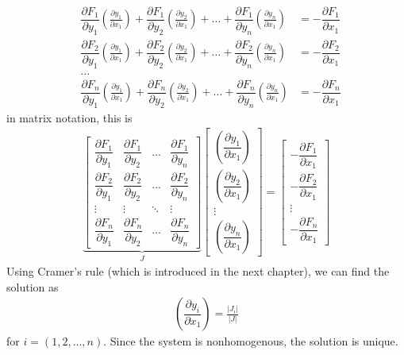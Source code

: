 \documentclass[10pt,a4paper]{book}
\theoremstyle{definition}\newtheorem{definition}{Definition}
\theoremstyle{definition}\newtheorem{fact}{Fact}
\theoremstyle{definition}\newtheorem{ex}{Ex.}
\theoremstyle{definition}\newtheorem{project}{Project}
\theoremstyle{definition}\newtheorem{problem}{Problem}
\theoremstyle{definition}\newtheorem{example}{Example}
\numberwithin{theorem}{chapter}
\numberwithin{corollary}{chapter}
\numberwithin{assumption}{chapter}
\numberwithin{definition}{chapter}
\numberwithin{prop}{chapter}
\numberwithin{notation}{chapter}
\numberwithin{problem}{chapter}
\numberwithin{example}{chapter}
\numberwithin{fact}{chapter}
\numberwithin{ex}{chapter}
\begin{document}
	\begin{align*}
		&\dfrac{\partial F_1}{\partial y_1} \left( \frac{\partial y_1}{\partial x_1} \right) + \dfrac{\partial F_1}{\partial y_2} \left( \frac{\partial y_2}{\partial x_1} \right) + \dots + \dfrac{\partial F_1}{\partial y_n} \left( \frac{\partial y_n}{\partial x_1} \right) &= -  \dfrac{\partial F_1}{\partial x_1}  \\
		&\dfrac{\partial F_2}{\partial y_1} \left( \frac{\partial y_1}{\partial x_1} \right) + \dfrac{\partial F_2}{\partial y_2} \left( \frac{\partial y_2}{\partial x_1} \right) + \dots + \dfrac{\partial F_2}{\partial y_n} \left( \frac{\partial y_n}{\partial x_1} \right) &= -  \dfrac{\partial F_2}{\partial x_1}  \\
		&\dots \\
		&\dfrac{\partial F_n}{\partial y_1} \left( \frac{\partial y_1}{\partial x_1} \right) + \dfrac{\partial F_n}{\partial y_2} \left( \frac{\partial y_2}{\partial x_1} \right) + \dots + \dfrac{\partial F_n}{\partial y_n} \left( \frac{\partial y_n}{\partial x_1} \right) &= -  \dfrac{\partial F_n}{\partial x_1} 
	\end{align*}	
	in matrix notation, this is
	\begin{align*}
		\underbrace{\begin{bmatrix}
			\dfrac{\partial F_1}{\partial y_1} & \dfrac{\partial F_1}{\partial y_2} & \dots & \dfrac{\partial F_1}{\partial y_n} \\ 
			\dfrac{\partial F_2}{\partial y_1} & \dfrac{\partial F_2}{\partial y_2} & \dots & \dfrac{\partial F_2}{\partial y_n} \\
			\vdots & \vdots & \ddots & \vdots \\
			\dfrac{\partial F_n}{\partial y_1} & \dfrac{\partial F_n}{\partial y_2} & \dots & \dfrac{\partial F_n}{\partial y_n} 
		\end{bmatrix}}_{J}
		\begin{bmatrix}
			\left( \dfrac{\partial y_1}{\partial x_1} \right) \\ \left( \dfrac{\partial y_2}{\partial x_1} \right) \\ \vdots \\ \left( \dfrac{\partial y_n}{\partial x_1} \right)
		\end{bmatrix}
		=
		\begin{bmatrix}
			-  \dfrac{\partial F_1}{\partial x_1} \\
			-  \dfrac{\partial F_2}{\partial x_1} \\
			\vdots \\
			-  \dfrac{\partial F_n}{\partial x_1}
		\end{bmatrix}
	\end{align*} 
	Using Cramer's rule (which is introduced in the next chapter), we can find the solution as
	\begin{align*}
		\left( \dfrac{\partial y_i}{\partial x_1} \right) = \frac{|J_i|}{|J|}
	\end{align*}
	for $i = (1,2,\dots,n)$. Since the system is nonhomogenous, the solution is unique.
	
\end{document}
